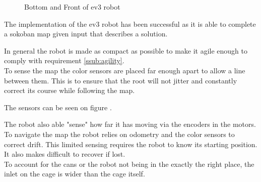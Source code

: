 \documentclass[../../main.tex]{subfiles}
\begin{document}
\begin{figure}[h]
	\centering

	\caption{Bottom and Front of ev3 robot}
	\label{fig:front_and_bottom}
\end{figure}

The implementation of the ev3 robot has been successful as it is able to complete a sokoban map given input that describes a solution.

In general the robot is made as compact as possible to make it agile enough to comply with
requirement \ref{ssub:agility}.\\


To sense the map the color sensors are placed far enough apart to allow a line between them.
This is to ensure that the root will not jitter and constantly correct its course while
following the map.

The sensors can be seen on figure .

The robot also able "sense" how far it has moving via the encoders in the motors.\\

To navigate the map the robot relies on odometry and the color sensors to correct drift.
This limited sensing requires the robot to know its starting position. It also makes difficult
to recover if lost.\\

To account for the cans or the robot  not being in the exactly the right place, the inlet on the cage
is wider than the cage itself.
	
\end{document}
